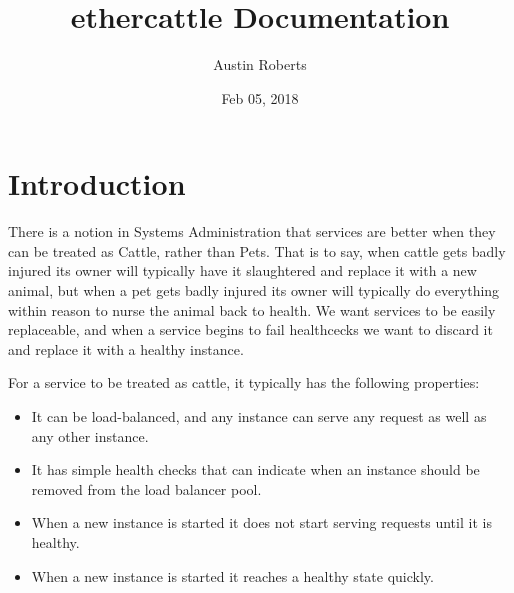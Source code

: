 \documentclass[letterpaper,10pt,english]{sphinxmanual}
\title{ethercattle Documentation}
\date{Feb 05, 2018}
\author{Austin Roberts}
\begin{document}
\maketitle
\sphinxtableofcontents
{}\label{\detokenize{index::doc}}



\chapter{Introduction}
\label{\detokenize{topics/intro:introduction}}\label{\detokenize{topics/intro::doc}}\label{\detokenize{topics/intro:welcome-to-ethercattle-s-documentation}}
There is a notion in Systems Administration that services are better when they
can be treated as Cattle, rather than Pets. That is to say, when cattle gets
badly injured its owner will typically have it slaughtered and replace it with
a new animal, but when a pet gets badly injured its owner will typically do
everything within reason to nurse the animal back to health. We want services
to be easily replaceable, and when a service begins to fail healthcecks we want
to discard it and replace it with a healthy instance.

For a service to be treated as cattle, it typically has the following
properties:
\begin{itemize}
\item {} 
It can be load-balanced, and any instance can serve any request as well as
any other instance.

\item {} 
It has simple health checks that can indicate when an instance should be
removed from the load balancer pool.

\item {} 
When a new instance is started it does not start serving requests until it
is healthy.

\item {} 
When a new instance is started it reaches a healthy state quickly.

\end{itemize}
\end{document}

